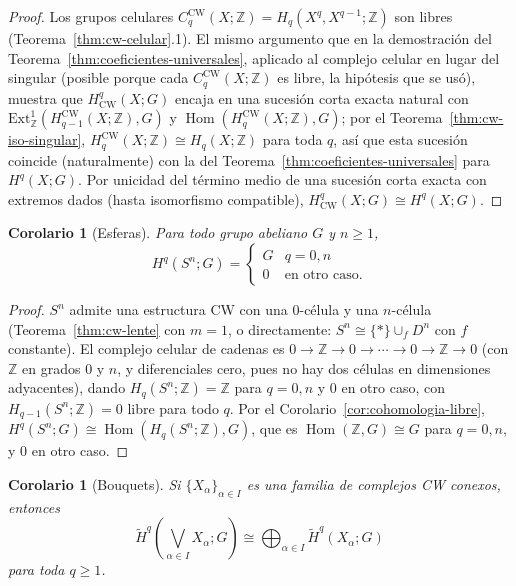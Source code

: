 \documentclass[11pt,a4paper]{article}
\theoremstyle{plain}
\newtheorem{corollary}[theorem]{Corolario}
\theoremstyle{definition}
\theoremstyle{remark}
\newcommand{\ZZ}{\mathbb Z}
\DeclareMathOperator{\Hom}{Hom}
\newcommand{\CWq}{\mathrm{CW}}
\begin{document}
\begin{proof}
Los grupos celulares $C_q^{\CWq}(X;\ZZ)=H_q(X^q,X^{q-1};\ZZ)$ son libres
(Teorema~\ref{thm:cw-celular}.1). El mismo argumento que en la
demostración del Teorema~\ref{thm:coeficientes-universales}, aplicado al
complejo celular en lugar del singular (posible porque cada
$C_q^{\CWq}(X;\ZZ)$ es libre, la hipótesis que se usó), muestra que
$H^q_{\CWq}(X;G)$ encaja en una sucesión corta exacta natural con
$\mathrm{Ext}^1_\ZZ(H_{q-1}^{\CWq}(X;\ZZ),G)$ y $\Hom(H_q^{\CWq}(X;\ZZ),G)$;
por el Teorema~\ref{thm:cw-iso-singular}, $H_q^{\CWq}(X;\ZZ)\cong H_q(X;\ZZ)$
para toda $q$, así que esta sucesión coincide (naturalmente) con la del
Teorema~\ref{thm:coeficientes-universales} para $H^q(X;G)$. Por unicidad
del término medio de una sucesión corta exacta con extremos dados (hasta
isomorfismo compatible), $H^q_{\CWq}(X;G)\cong H^q(X;G)$.
\end{proof}

\begin{corollary}[Esferas]
\label{cor:cohomologia-esferas}
Para todo grupo abeliano $G$ y $n\ge1$,
\[
H^q(S^n;G)=\begin{cases}G & q=0,n\\0 & \text{en otro caso.}\end{cases}
\]
\end{corollary}

\begin{proof}
$S^n$ admite una estructura CW con una $0$-célula y una $n$-célula
(Teorema~\ref{thm:cw-lente} con $m=1$, o directamente: $S^n\cong\{*\}\cup_fD^n$
con $f$ constante). El complejo celular de cadenas es
$0\to\ZZ\to0\to\cdots\to0\to\ZZ\to0$ (con $\ZZ$ en grados $0$ y $n$, y
diferenciales cero, pues no hay dos células en dimensiones adyacentes),
dando $H_q(S^n;\ZZ)=\ZZ$ para $q=0,n$ y $0$ en otro caso, con
$H_{q-1}(S^n;\ZZ)=0$ libre para todo $q$. Por el
Corolario~\ref{cor:cohomologia-libre},
$H^q(S^n;G)\cong\Hom(H_q(S^n;\ZZ),G)$, que es $\Hom(\ZZ,G)\cong G$ para
$q=0,n$, y $0$ en otro caso.
\end{proof}

\begin{corollary}[Bouquets]
\label{cor:cohomologia-bouquets}
Si $\{X_\alpha\}_{\alpha\in I}$ es una familia de complejos CW conexos,
entonces
\[
\tilde H^q\left(\bigvee_{\alpha\in I}X_\alpha;G\right)\cong\bigoplus_{\alpha\in I}\tilde H^q(X_\alpha;G)
\]
para toda $q\ge1$.
\end{corollary}
\end{document}
